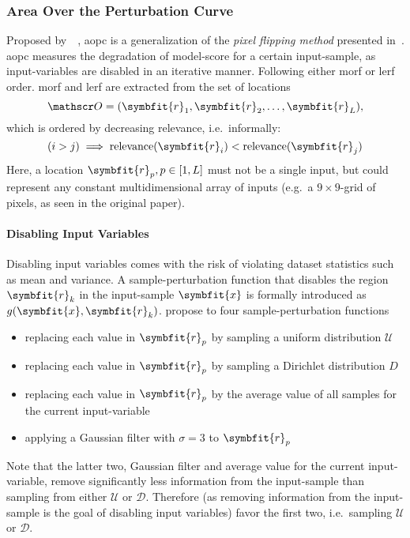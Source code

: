 \subsubsection{Area Over the Perturbation Curve}\label{metrics:aopc} Proposed by~\citeauthor{WojciechSamek.2015}~\cite{WojciechSamek.2015}, \gls{aopc} is a generalization of the \textit{pixel flipping method} presented in~\cite[pp. 34ff.]{Bach.2015}. \gls{aopc} measures the degradation of model-score for a certain input-sample, as input-variables are disabled in an iterative manner. Following either \gls{morf} or \gls{lerf} order. \gls{morf} and \gls{lerf} are extracted from the set of locations \[ \mathscr O = (\symbfit{r}_1, \symbfit{r}_2, \dots, \symbfit{r}_L), \]  which is ordered by decreasing relevance, i.e.\ informally: \[(i > j) \implies \text{relevance}(\symbfit{r}_i) < \text{relevance}(\symbfit{r}_j) \] Here, a location \( \symbfit{r}_p, p \in [1, L] \) must not be a single input, but could represent any constant multidimensional array of inputs (e.g.\ a \( 9\times9 \)-grid of pixels, as seen in the original paper).

\paragraph{Disabling Input Variables}
Disabling input variables comes with the risk of violating dataset statistics such as mean and variance. A sample-perturbation function that disables the region \(\symbfit{r}_k\) in the input-sample \(\symbfit{x}\) is formally introduced as \(g(\symbfit{x}, \symbfit{r}_k)\). \citeauthor{WojciechSamek.2015} propose to four sample-perturbation functions
\begin{itemize}
    \item replacing each value in \(\symbfit{r}_p\) by sampling a uniform distribution \(\mathscr U\)
    \item replacing each value in \(\symbfit{r}_p\) by sampling a Dirichlet distribution \(D\)
    \item replacing each value in \(\symbfit{r}_p\) by the average value of all samples for the current input-variable
    \item applying a Gaussian filter with \(\sigma = 3\) to \(\symbfit{r}_p\)
\end{itemize}
Note that the latter two, Gaussian filter and average value for the current input-variable, remove significantly less information from the input-sample than sampling from either \(\mathscr U\) or \(\mathscr D\).  Therefore (as removing information from the input-sample is the goal of disabling input variables) \citeauthor{WojciechSamek.2015} favor the first two, i.e.\ sampling \(\mathscr U\) or \(\mathscr D\).



